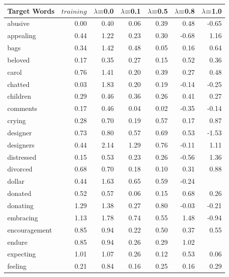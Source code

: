 \documentclass[11pt,a4paper]{article}
\begin{document}
\begin{table}[t]
\small
\centering
    \begin{tabular}{|l|r|r|r|r|r|r|}
     \toprule
     
    \textbf{Target Words}  & \textbf{$training$} & \textbf{$\lambda$}{=0.0}  & \textbf{$\lambda$}{=0.1}& \textbf{$\lambda$}{=0.5} & \textbf{$\lambda$}{=0.8} & \textbf{$\lambda$}{=1.0}   \\
      \midrule

abusive       & 0.00 & 0.40 & 0.06 & 0.39 & 0.48  & -0.65 \\
appealing     & 0.44 & 1.22 & 0.23 & 0.30 & -0.68 & 1.16  \\
bags          & 0.34 & 1.42 & 0.48 & 0.05 & 0.16  & 0.64  \\
beloved       & 0.17 & 0.35 & 0.27 & 0.15 & 0.52  & 0.36  \\
carol         & 0.76 & 1.41 & 0.20 & 0.39 & 0.27  & 0.48  \\
chatted       & 0.03 & 1.83 & 0.20 & 0.19 & -0.14 & -0.25 \\
children      & 0.29 & 0.46 & 0.36 & 0.26 & 0.41  & 0.27  \\
comments      & 0.17 & 0.46 & 0.04 & 0.02 & -0.35 & -0.14 \\
crying        & 0.28 & 0.70 & 0.19 & 0.57 & 0.17  & 0.87  \\
designer      & 0.73 & 0.80 & 0.57 & 0.69 & 0.53  & -1.53 \\
designers     & 0.44 & 2.14 & 1.29 & 0.76 & -0.11 & 1.11  \\
distressed    & 0.15 & 0.53 & 0.23 & 0.26 & -0.56 & 1.36  \\
divorced      & 0.68 & 0.70 & 0.18 & 0.10 & 0.31  & 0.88  \\
dollar        & 0.44 & 1.63 & 0.65 & 0.59 & -0.24 &       \\
donated       & 0.52 & 0.57 & 0.06 & 0.15 & 0.68  & 0.26  \\
donating      & 1.29 & 1.38 & 0.27 & 0.80 & -0.03 & -0.21 \\
embracing     & 1.13 & 1.78 & 0.74 & 0.55 & 1.48  & -0.94 \\
encouragement & 0.85 & 0.94 & 0.22 & 0.50 & 0.37  & 0.55  \\
endure        & 0.85 & 0.94 & 0.26 & 0.29 & 1.02  &       \\
expecting     & 1.01 & 1.07 & 0.26 & 0.12 & 0.53  & 0.06  \\
feeling       & 0.21 & 0.84 & 0.16 & 0.25 & 0.16  & 0.29  \\

\end{tabular}
\end{table}
\end{document}
